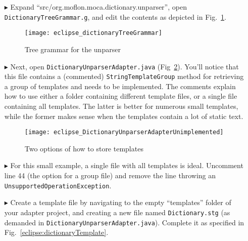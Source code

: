 \begin{itemize}

\item[$\blacktriangleright$] Expand ``src/org.moflon.moca.dictionary.unparser'', open \texttt{Dict\-ion\-ary\-Tree\-Gram\-mar.g}, and edit the contents as
depicted in Fig.~\ref{eclipse:treeGrammar}. 

\vspace{0.5cm}

\begin{figure}[htpb]
\begin{center}
  \texttt{[image: eclipse\_dictionaryTreeGrammar]}
  \caption{Tree grammar for the unparser}
  \label{eclipse:treeGrammar}
\end{center}
\end{figure}

\newpage


\item[$\blacktriangleright$] Next, open \texttt{Dict\-ion\-ary\-Un\-pars\-er\-Ad\-ap\-ter.java} (Fig~\ref{eclipse:unparserCommented}). You'll notice that this
file contains a (commented) \texttt{StringTemplateGroup} method for retrieving a group of templates and needs to be implemented. The comments explain how to use
either a folder containing different template files, or a single file containing all templates. The latter is better for numerous small templates, while the
former makes sense when the templates contain a lot of static text.

\vspace{0.5cm}

\begin{figure}[htpb]
\begin{center}
  \texttt{[image: eclipse\_DictionaryUnparserAdapterUnimplemented]}
  \caption{Two options of how to store templates}
  \label{eclipse:unparserCommented}
\end{center}
\end{figure}


\item[$\blacktriangleright$] For this small example, a single file with all templates is ideal. Uncomment line 44 (the option for a group file) and remove
the line throwing an \texttt{Un\-sup\-port\-ed\-Op\-er\-at\-ion\-Ex\-cep\-tion}.

\item[$\blacktriangleright$] Create a template file by navigating to the empty ``templates'' folder of your adapter project, and creating a new file
named \texttt{Dictionary.stg} (as demanded in \texttt{Dict\-ion\-ary\-Un\-pars\-er\-Ad\-ap\-ter.java}). Complete it as specified in
Fig.~\ref{eclipse:dictionaryTemplate}.


\end{itemize}
